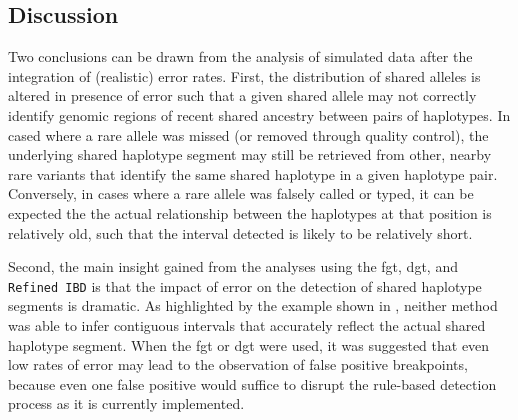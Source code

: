 %
%
%
%


%
\subsection{Discussion}
%

Two conclusions can be drawn from the analysis of simulated data after the integration of (realistic) error rates.
First, the distribution of shared alleles is altered in presence of error such that a given shared allele may not correctly identify genomic regions of recent shared ancestry between pairs of haplotypes.
In cased where a rare allele was missed (or removed through quality control), the underlying shared haplotype segment may still be retrieved from other, nearby rare variants that identify the same shared haplotype in a given haplotype pair.
Conversely, in cases where a rare allele was falsely called or typed, it can be expected the the actual relationship between the haplotypes at that position is relatively old, such that the interval detected is likely to be relatively short.

Second, the main insight gained from the analyses using the \gls{fgt}, \gls{dgt}, and \texttt{Refined\,IBD} is that the impact of error on the detection of shared haplotype segments is dramatic.
As highlighted by the example shown in , neither method was able to infer contiguous intervals that accurately reflect the actual shared haplotype segment.
When the \gls{fgt} or \gls{dgt} were used, it was suggested that even low rates of error may lead to the observation of false positive breakpoints, because even one false positive would suffice to disrupt the rule-based detection process as it is currently implemented.

